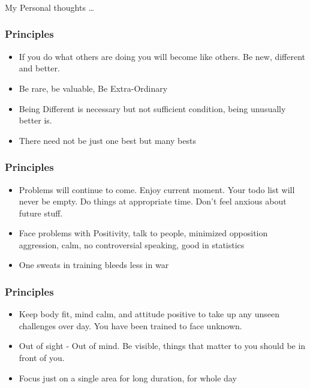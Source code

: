 \begin{frame}[fragile]\frametitle{}
\begin{center}
{\Large My Personal thoughts \ldots}
\end{center}
\end{frame}
\begin{frame}[fragile]\frametitle{Principles}
\begin{itemize}
\item If you do what others are doing you will become like others. Be new, different and better.
\item Be rare, be valuable, Be Extra-Ordinary
\item Being Different is necessary but not sufficient condition, being unusually better is.
\item There need not be just one best but many bests
\end{itemize}
\end{frame}

\begin{frame}[fragile]\frametitle{Principles}
\begin{itemize}
\item Problems will continue to come. Enjoy current moment. Your todo list will never be empty. Do things at appropriate time. Don't feel anxious about future stuff.
\item Face problems with Positivity, talk to people, minimized opposition aggression, calm, no controversial speaking, good in statistics
\item One sweats in training bleeds less in war
\end{itemize}
\end{frame}

\begin{frame}[fragile]\frametitle{Principles}
\begin{itemize}
\item Keep body fit, mind calm,  and attitude positive  to take up any unseen challenges over day. You have been trained to face unknown.
\item Out of sight - Out of mind. Be visible, things that matter to you should be in front of you.
\item Focus just on a single area for long duration, for whole day
\end{itemize}
\end{frame}

